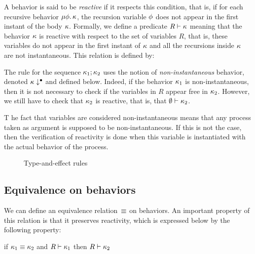 \documentclass[9pt,preprint]{sigplanconf}
\begin{document}
A behavior is said to be \emph{reactive} if it respects this condition, that is, if for each recursive behavior $\mu \phi.\, \kappa$, the recursion variable $\phi$ does not appear in the first instant of the body $\kappa$. Formally, we define a predicate $R \vdash \kappa$ meaning that the behavior $\kappa$ is reactive with respect to the set of variables $R$, that is, these variables do not appear in the first instant of $\kappa$ and all the recursions inside $\kappa$ are not instantaneous. This relation is defined by:
%

%
The rule for the sequence $\kappa_1 ; \kappa_2$ uses the notion of \emph{non-instantaneous} behavior, denoted $\kappa\downarrow^{\bullet}$ and defined below. Indeed, if the behavior $\kappa_1$ is non-instantaneous, then it is not necessary to check if the variables in $R$ appear free in $\kappa_2$. However, we still have to check that $\kappa_2$ is reactive, that is, that $\emptyset \vdash \kappa_2$.
%

%
T he fact that variables are considered non-instantaneous means that any process taken as argument is supposed to be non-instantan\-eous. If this is not the case, then the verification of reactivity is done when this variable is instantiated with the actual behavior of the process.

\begin{figure*}[t]


\caption{Type-and-effect rules}
\label{fig:rules}
\end{figure*}

\subsection{Equivalence on behaviors}
\label{sec:equiv_behaviors}

We can define an equivalence relation~$\equiv$ on behaviors. An important property of this relation is that it preserves reactivity, which is expressed below by the following property:
\begin{property}
\label{prop:equiv_reactivty}
if $\kappa_1 \equiv \kappa_2$ and $R \vdash \kappa_1$ then $R \vdash \kappa_2$
\end{property}
\end{document}
